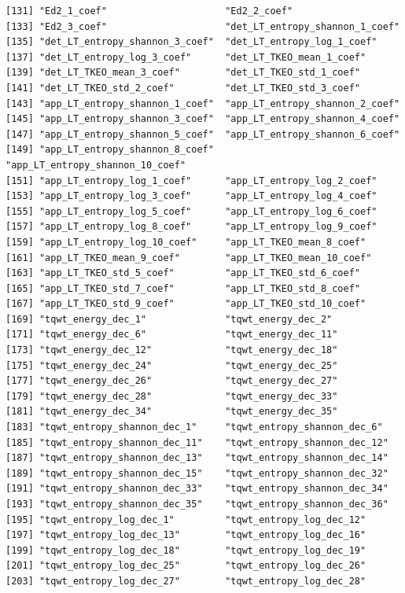 \documentclass[
]{article}
\begin{document}
\begin{verbatim}
[131] "Ed2_1_coef"                     "Ed2_2_coef"                    
[133] "Ed2_3_coef"                     "det_LT_entropy_shannon_1_coef" 
[135] "det_LT_entropy_shannon_3_coef"  "det_LT_entropy_log_1_coef"     
[137] "det_LT_entropy_log_3_coef"      "det_LT_TKEO_mean_1_coef"       
[139] "det_LT_TKEO_mean_3_coef"        "det_LT_TKEO_std_1_coef"        
[141] "det_LT_TKEO_std_2_coef"         "det_LT_TKEO_std_3_coef"        
[143] "app_LT_entropy_shannon_1_coef"  "app_LT_entropy_shannon_2_coef" 
[145] "app_LT_entropy_shannon_3_coef"  "app_LT_entropy_shannon_4_coef" 
[147] "app_LT_entropy_shannon_5_coef"  "app_LT_entropy_shannon_6_coef" 
[149] "app_LT_entropy_shannon_8_coef"  "app_LT_entropy_shannon_10_coef"
[151] "app_LT_entropy_log_1_coef"      "app_LT_entropy_log_2_coef"     
[153] "app_LT_entropy_log_3_coef"      "app_LT_entropy_log_4_coef"     
[155] "app_LT_entropy_log_5_coef"      "app_LT_entropy_log_6_coef"     
[157] "app_LT_entropy_log_8_coef"      "app_LT_entropy_log_9_coef"     
[159] "app_LT_entropy_log_10_coef"     "app_LT_TKEO_mean_8_coef"       
[161] "app_LT_TKEO_mean_9_coef"        "app_LT_TKEO_mean_10_coef"      
[163] "app_LT_TKEO_std_5_coef"         "app_LT_TKEO_std_6_coef"        
[165] "app_LT_TKEO_std_7_coef"         "app_LT_TKEO_std_8_coef"        
[167] "app_LT_TKEO_std_9_coef"         "app_LT_TKEO_std_10_coef"       
[169] "tqwt_energy_dec_1"              "tqwt_energy_dec_2"             
[171] "tqwt_energy_dec_6"              "tqwt_energy_dec_11"            
[173] "tqwt_energy_dec_12"             "tqwt_energy_dec_18"            
[175] "tqwt_energy_dec_24"             "tqwt_energy_dec_25"            
[177] "tqwt_energy_dec_26"             "tqwt_energy_dec_27"            
[179] "tqwt_energy_dec_28"             "tqwt_energy_dec_33"            
[181] "tqwt_energy_dec_34"             "tqwt_energy_dec_35"            
[183] "tqwt_entropy_shannon_dec_1"     "tqwt_entropy_shannon_dec_6"    
[185] "tqwt_entropy_shannon_dec_11"    "tqwt_entropy_shannon_dec_12"   
[187] "tqwt_entropy_shannon_dec_13"    "tqwt_entropy_shannon_dec_14"   
[189] "tqwt_entropy_shannon_dec_15"    "tqwt_entropy_shannon_dec_32"   
[191] "tqwt_entropy_shannon_dec_33"    "tqwt_entropy_shannon_dec_34"   
[193] "tqwt_entropy_shannon_dec_35"    "tqwt_entropy_shannon_dec_36"   
[195] "tqwt_entropy_log_dec_1"         "tqwt_entropy_log_dec_12"       
[197] "tqwt_entropy_log_dec_13"        "tqwt_entropy_log_dec_16"       
[199] "tqwt_entropy_log_dec_18"        "tqwt_entropy_log_dec_19"       
[201] "tqwt_entropy_log_dec_25"        "tqwt_entropy_log_dec_26"       
[203] "tqwt_entropy_log_dec_27"        "tqwt_entropy_log_dec_28"       

\end{verbatim}
\end{document}
